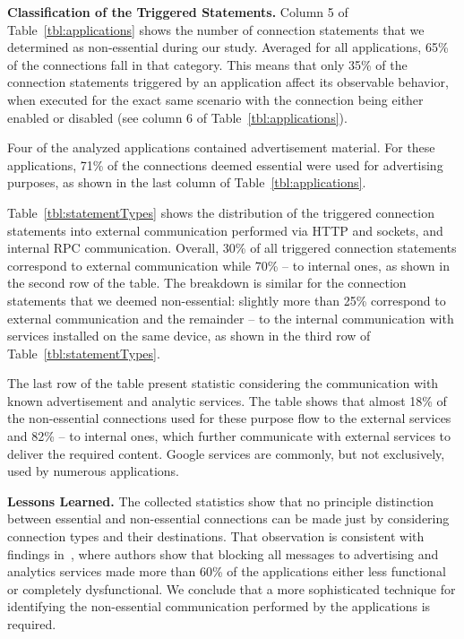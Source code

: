 \vspace{0.1in}
\noindent 
{\bf Classification of the Triggered Statements.}
Column 5 of Table~\ref{tbl:applications} shows the number of connection statements that we determined as non-essential during our study. 
Averaged for all applications, 65\% of the connections fall in that category. 
This means that only 35\% of the connection statements triggered by an application affect its observable behavior, 
when executed for the exact same scenario with the connection being either enabled or disabled (see column 6 of Table~\ref{tbl:applications}). 

Four of the analyzed applications contained advertisement material. For these applications, 71\% of the connections deemed  essential were used for advertising purposes, as shown in the last column of Table~\ref{tbl:applications}.



Table~\ref{tbl:statementTypes} shows the distribution of the triggered connection statements 
into external communication performed via HTTP and sockets, and internal RPC communication. 
Overall, 30\% of all triggered connection statements correspond to external communication while 70\% -- to
internal ones, as shown in the second row of the table.
The breakdown is similar for the connection statements that we deemed non-essential: slightly more than 25\%
correspond to external communication and the remainder -- to the internal communication with services installed on the same device, as shown in the third row of Table~\ref{tbl:statementTypes}.

The last row of the table present statistic considering the communication with known advertisement and analytic services. The table shows that almost 18\% of the non-essential connections used for these purpose flow to the external services and 82\% -- to internal ones, which further communicate with external services to deliver the required content. 
Google services are commonly, but not exclusively, used by numerous applications. 


\vspace{0.1in}
\noindent 
{\bf Lessons Learned.}
The collected statistics show that no principle distinction between essential and non-essential connections  
can be made just by considering connection types and their destinations. 
That observation is consistent with findings in~\cite{Hornyack:Han:Jung:Schechter:Wetherall:CCS11}, where authors 
show that blocking all messages to advertising and analytics services made more than 60\% of the applications either less functional or completely dysfunctional. 
We conclude that a more sophisticated 
technique for identifying the non-essential communication performed by the applications is required. 


